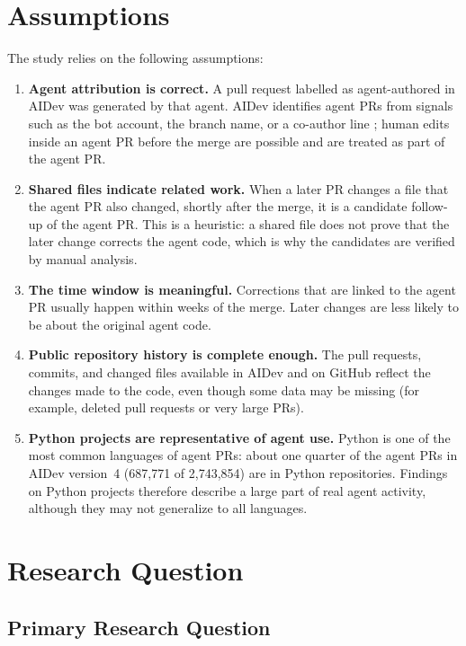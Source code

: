 \section{Assumptions}
\label{sec:assumptions}

The study relies on the following assumptions:

\begin{enumerate}
  \item \textbf{Agent attribution is correct.} A pull request labelled as
  agent-authored in AIDev was generated by that agent. AIDev identifies agent PRs
  from signals such as the bot account, the branch name, or a co-author line
  \cite{li2026aidev}; human edits inside an agent PR before the merge are
  possible and are treated as part of the agent PR.
  \item \textbf{Shared files indicate related work.} When a later PR changes a
  file that the agent PR also changed, shortly after the merge, it is a
  candidate follow-up of the agent PR. This is a heuristic: a shared file does
  not prove that the later change corrects the agent code, which is why the
  candidates are verified by manual analysis.
  \item \textbf{The time window is meaningful.} Corrections that are linked to
  the agent PR usually happen within weeks of the merge. Later changes are
  less likely to be about the original agent code.
  \item \textbf{Public repository history is complete enough.} The pull requests,
  commits, and changed files available in AIDev and on GitHub reflect the
  changes made to the code, even though some data may be missing (for example,
  deleted pull requests or very large PRs).
  \item \textbf{Python projects are representative of agent use.} Python is one
  of the most common languages of agent PRs: about one quarter of the agent PRs
  in AIDev version~4 (687,771 of 2,743,854) are in Python repositories. Findings
  on Python projects therefore describe a large part of real agent activity,
  although they may not generalize to all languages.
\end{enumerate}

\section{Research Question}
\label{sec:research-question}

\subsection{Primary Research Question}
\label{subsec:primary-research-question}

